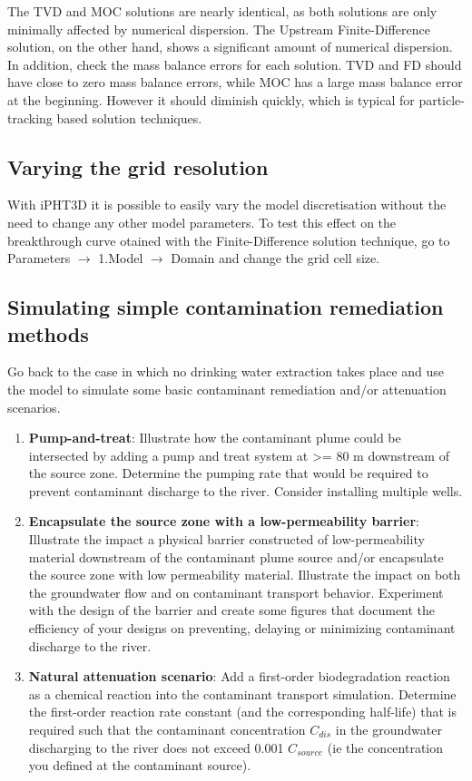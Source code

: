 The TVD and MOC solutions are nearly identical, as both solutions are only 
minimally affected by numerical dispersion. The Upstream Finite-Difference solution, 
on the other hand, shows a significant amount of numerical dispersion.
In addition, check the mass balance errors for each solution. TVD and FD should have
close to zero mass balance errors, while MOC has a large mass balance error at the
beginning. However it should diminish quickly, which is typical for 
particle-tracking based solution techniques.

\subsection{Varying the grid resolution}

With iPHT3D it is possible to easily vary the model discretisation
without the need to change any other model parameters.
To test this effect on the breakthrough curve otained with the Finite-Difference solution technique, 
go to {\color{blue}Parameters} $\rightarrow$ {\color{blue}1.Model} 
$\rightarrow$ {\color{blue}Domain} and change the grid cell size.	 

\subsection{Simulating simple contamination remediation methods}
%	 
Go back to the case in which no drinking water extraction takes place and use the model to simulate some basic contaminant remediation and/or attenuation scenarios.
\begin{enumerate}
	\item \textbf{Pump-and-treat}: Illustrate how the contaminant plume could be
      intersected by adding a pump and treat system at >= 80 m downstream of the source zone. Determine the
      pumping rate that would be required to prevent contaminant discharge to the river. Consider 
	  installing multiple wells.
	\item \textbf{Encapsulate the source zone with a low-permeability barrier}: Illustrate
	  the impact a physical barrier constructed of low-permeability material downstream of the contaminant
	  plume source and/or encapsulate the source zone with low permeability material. Illustrate the impact
	  on both the groundwater flow and on contaminant transport behavior. Experiment with the design of 
	  the barrier and create some figures that document the efficiency of your designs on preventing, 
	  delaying or minimizing contaminant discharge to the river.
	\item \textbf{Natural attenuation scenario}: Add a first-order biodegradation reaction as a chemical
	  reaction into the contaminant transport simulation. Determine the first-order reaction rate constant
	  (and the corresponding half-life) that is required such that the contaminant concentration $C_{dis}$ in
	  the groundwater discharging to the river does not exceed 0.001 $C_{source}$ (ie the concentration you
	  defined at the contaminant source).

\end{enumerate}